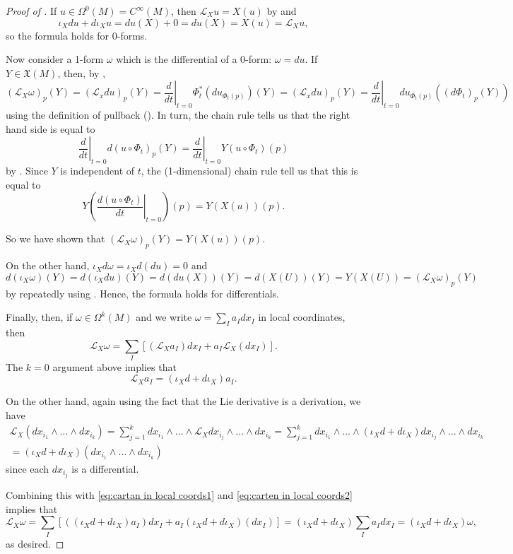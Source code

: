 \begin{proof}[Proof of ]
	If $u \in \Omega^0(M) = C^\infty(M)$, then $\mathcal{L}_Xu = X(u)$ by  and
	\[
		\iota_X du + d\iota_Xu = du(X) + 0 = du(X) = X(u) = \mathcal{L}_Xu ,
	\]
	so the formula holds for 0-forms.
	
	Now consider a 1-form $\omega$ which is the differential of a 0-form: $\omega = du$. If $Y \in \mathfrak{X}(M)$, then, by ,
	\[
		(\mathcal{L}_X\omega)_p(Y) = (\mathcal{L}_xdu)_p(Y) = \left. \frac{d}{dt} \right|_{t=0} \Phi_t^\ast(du_{\Phi_t(p)})(Y) = (\mathcal{L}_xdu)_p(Y) = \left. \frac{d}{dt} \right|_{t=0} du_{\Phi_t(p)}((d\Phi_t)_p(Y))
	\]
	using the definition of pullback (). In turn, the chain rule tells us that the right hand side is equal to
	\[
		\left. \frac{d}{dt} \right|_{t=0} d(u \circ\Phi_t)_p(Y) = \left. \frac{d}{dt} \right|_{t=0} Y(u \circ\Phi_t)(p)
	\]
	by . Since $Y$ is independent of $t$, the (1-dimensional) chain rule tell us that this is equal to
	\[
		Y \left( \left. \frac{d(u \circ \Phi_t)}{dt} \right|_{t=0}\right)(p) = Y(X(u))(p).
	\]
	
	So we have shown that $(\mathcal{L}_X\omega)_p(Y) = Y(X(u))(p)$.
	
	On the other hand, $\iota_X d\omega = \iota_X d(du) = 0$ and
	\[
		d(\iota_X\omega)(Y) = d(\iota_X du)(Y) = d(du(X))(Y) = d(X(U))(Y) = Y(X(U)) = (\mathcal{L}_X\omega)_p(Y)
	\]
	by repeatedly using . Hence, the formula holds for differentials.
	
	Finally, then, if $\omega \in \Omega^k(M)$ and we write $\omega = \sum_I a_I dx_I$ in local coordinates, then
	\begin{equation}\label{eq:cartan in local coords1}
		\mathcal{L}_X\omega = \sum_I \left[ (\mathcal{L}_X a_I)dx_I + a_I \mathcal{L}_X(dx_I)\right].
	\end{equation}
	The $k=0$ argument above implies that 
	\begin{equation}\label{eq:carten in local coords2}
		\mathcal{L}_X a_I = (\iota_X d + d \iota_X)a_I.
	\end{equation} 
	
	On the other hand, again using the fact that the Lie derivative is a derivation, we have
	\begin{multline*}
		\mathcal{L}_X (dx_{i_1} \wedge \dots \wedge dx_{i_k}) = \sum_{j=1}^k dx_{i_1} \wedge \dots \wedge \mathcal{L}_X dx_{i_j}  \wedge \dots \wedge  dx_{i_k} = \sum_{j=1}^k dx_{i_1} \wedge \dots \wedge (\iota_X d + d \iota_X) dx_{i_j}  \wedge \dots \wedge dx_{i_k} \\
		= (\iota_X d + d \iota_X)(dx_{i_1} \wedge \dots \wedge dx_{i_k})
	\end{multline*}
	since each $dx_{i_j}$ is a differential.
	
	Combining this with \eqref{eq:cartan in local coords1} and \eqref{eq:carten in local coords2} implies that 
	\[
		\mathcal{L}_X\omega = \sum_I \left[ ((\iota_X d + d \iota_X) a_I)dx_I + a_I (\iota_X d + d \iota_X)(dx_I)\right] = (\iota_X d + d \iota_X)\sum_I a_I dx_I = (\iota_X d + d \iota_X)\omega,
	\]
	as desired.
\end{proof}
